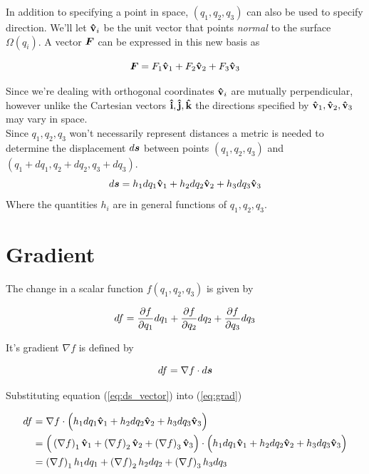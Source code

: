 \documentclass[twoside, a4paper]{article}
\begin{document}
In addition to specifying a point in space, $(q_1,q_2,q_3)$ can also be used to specify direction. We'll let $\mathbf{\hat{v}}_i$ be the unit vector that points \textit{normal} to the surface $\Omega(q_i)$. A vector $\mbox{\boldmath$ F $}$ can be expressed in this new basis as

\begin{equation*}
\mbox{\boldmath$ F $} = F_1 \mathbf{\hat{v}}_1 + F_2 \mathbf{\hat{v}}_2 + F_3 \mathbf{\hat{v}}_3
\end{equation*}

Since we're dealing with orthogonal coordinates $\mathbf{\hat{v}}_i$ are mutually perpendicular, however unlike the Cartesian vectors $\mathbf{\hat{i}}, \mathbf{\hat{j}}, \mathbf{\hat{k}}$ the directions specified by $\mathbf{\hat{v}}_1, \mathbf{\hat{v}}_2, \mathbf{\hat{v}}_3$ may vary in space.\\

Since $q_1, q_2, q_3$ won't necessarily represent distances a metric is needed to determine the displacement $d\mbox{\boldmath$ s $}$ between points \hbox{$(q_1,q_2,q_3)$} and \mbox{$(q_1+dq_1,q_2+dq_2,q_3+dq_3)$}.
\begin{equation}
\label{eq:ds_vector}
d\mbox{\boldmath$ s $} = h_1 dq_1 \mathbf{\hat{v}}_1 + h_2 dq_2 \mathbf{\hat{v}}_2 + h_3 dq_3 \mathbf{\hat{v}}_3
\end{equation}
Where the quantities $h_i$ are in general functions of $q_1,q_2,q_3$.

\section{Gradient}

The change in a scalar function $f(q_1,q_2,q_3)$ is given by 

\begin{equation}
\label{eq:df}
df = \frac{\partial f}{\partial q_1}dq_1+\frac{\partial f}{\partial q_2}dq_2+\frac{\partial f}{\partial q_3}dq_3
\end{equation}

It's gradient $\nabla f$ is defined by

\begin{equation}
\label{eq:grad}
df = \nabla f \cdot d\mbox{\boldmath$ s $}
\end{equation}

Substituting equation (\ref{eq:ds_vector}) into (\ref{eq:grad})

\begin{equation}
\label{eq:df-dot-ds}
\begin{split}
df 
& = \nabla f \cdot 
	\Big( h_1 dq_1 \mathbf{\hat{v}}_1 + h_2 dq_2 \mathbf{\hat{v}}_2 + h_3 dq_3 \mathbf{\hat{v}}_3 \Big) \\
& = \Big( \left( \nabla f \right)_1 \mathbf{\hat{v}}_1 + \left( \nabla f \right)_2 \mathbf{\hat{v}}_2 + \left( \nabla f \right)_3 \mathbf{\hat{v}}_3 \Big) \cdot 
	\Big( h_1 dq_1 \mathbf{\hat{v}}_1 + h_2 dq_2 \mathbf{\hat{v}}_2 + h_3 dq_3 \mathbf{\hat{v}}_3 \Big) \\
& = \left( \nabla f \right)_1 h_1 dq_1 + 
	 \left( \nabla f \right)_2 h_2 dq_2 + 
	 \left( \nabla f \right)_3 h_3 dq_3 \\
\end{split}
\end{equation}
\end{document}
